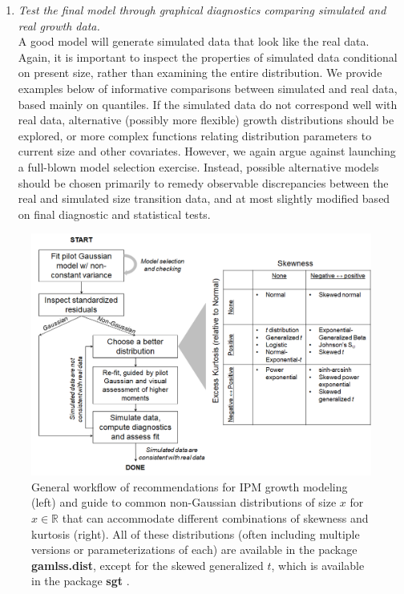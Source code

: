 \documentclass[12pt]{article}
\begin{document}
\begin{enumerate}
\item \textit{Test the final model through graphical diagnostics comparing simulated and real growth data.} 
\\
A good model will generate simulated data that look like the real data.  
Again, it is important to inspect the properties of simulated data conditional on present size, rather than examining the entire distribution.   
We provide examples below of informative comparisons between simulated and real data, based mainly on quantiles. 
If the simulated data do not correspond well with real data, alternative (possibly more flexible) growth distributions should be explored, or more complex
functions relating distribution parameters to current size and other covariates. 
However, we again argue against launching a full-blown model selection exercise. 
Instead, possible alternative models should be chosen primarily to remedy observable discrepancies between the real and simulated 
size transition data, and at most slightly modified based on final diagnostic and statistical tests.

\end{enumerate}

\begin{figure}
\centering
\includegraphics[width=\textwidth]{figures/workflow}
\caption{General workflow of recommendations for IPM growth modeling (left) and guide to common non-Gaussian distributions of size $x$ for $x \in \mathbb{R}$ that can accommodate different combinations of skewness and kurtosis (right). 
All of these distributions (often including multiple versions or parameterizations of each) are available in the package \textbf{gamlss.dist}, 
except for the skewed generalized $t$, which is available in the package \textbf{sgt} \citep{davis-2015}.}
\label{fig:workflow}
\end{figure} 
\end{document}
